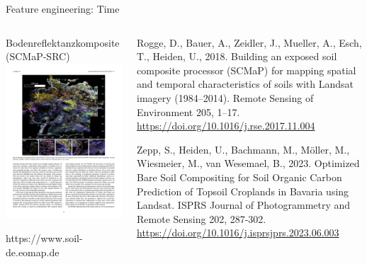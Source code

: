 \begin{frame}{Feature engineering: \alert{Time}}
\begin{columns}
 \column{8cm}
 \begin{block}{Bodenreflektanzkomposite (SCMaP-SRC)}
\centering\includegraphics[width=1\textwidth]{FIGURE/BareSoilIndex.pdf}

\raggedright\tiny https://www.soil-de.eomap.de
\end{block}
 \column{3cm}

\raggedright\tiny 
\begin{inparaitem}
    \item Rogge, D., Bauer, A., Zeidler, J., Mueller, A., Esch, T., Heiden, U., 2018. Building an exposed soil composite processor (SCMaP) for mapping spatial and temporal characteristics of soils with Landsat imagery (1984–2014). Remote Sensing of Environment 205, 1–17. \url{https://doi.org/10.1016/j.rse.2017.11.004      }
    \item Zepp, S., Heiden, U., Bachmann, M., Möller, M., Wiesmeier, M., van Wesemael, B., 2023. Optimized Bare Soil Compositing for Soil Organic Carbon Prediction of Topsoil Croplands in Bavaria using Landsat. ISPRS Journal of Photogrammetry and Remote Sensing 202, 287-302. \url{https://doi.org/10.1016/j.isprsjprs.2023.06.003         } 
\end{inparaitem}

\end{columns}
\end{frame}




